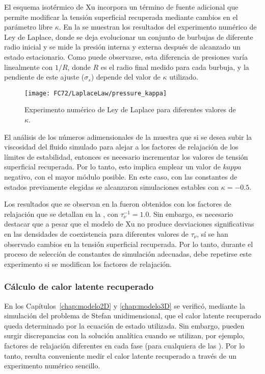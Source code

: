 El esquema isot\'ermico de Xu incorpora un t\'ermino de fuente adicional que permite modificar la tensi\'on superficial recuperada mediante cambios en el par\'ametro libre $\kappa$. En la  se muestran los resultados del experimento num\'erico de Ley de Laplace, donde se deja evolucionar un conjunto de burbujas de diferente radio inicial y se mide la presi\'on interna y externa despu\'es de alcanzado un estado estacionario. Como puede observarse, esta diferencia de presiones var\'ia linealmente con $1/R$, donde $R$ es el radio final medido para cada burbuja, y la pendiente de este ajuste ($\sigma_s$) depende del valor de $\kappa$ utilizado.

\begin{figure}[ht]
	\centering
	\texttt{[image: FC72/LaplaceLaw/pressure\_kappa]}
	\caption{Experimento num\'erico de Ley de Laplace para diferentes valores de $\kappa$.}
	\label{fig:delta_p_kappa}
\end{figure}

El an\'alisis de los n\'umeros adimensionales de la  muestra que si se desea subir la viscosidad del fluido simulado para alejar a los factores de relajaci\'on de los l\'imites de estabilidad, entonces es necesario incrementar los valores de tensi\'on superficial recuperada. Por lo tanto, esto implica emplear un valor de $kappa$ negativo, con el mayor m\'odulo posible. En este caso, con las constantes de estados previamente elegidas se alcanzaron simulaciones estables con $\kappa=-0.5$.

Los resultados que se observan en la  fueron obtenidos con los factores de relajaci\'on que se detallan en la , con $\tau_{\nu}^{-1}=1.0$. Sin embargo, es necesario destacar que a pesar que el modelo de Xu no produce desviaciones significativas en las densidades de coexistencia para diferentes valores de $\tau_{\nu}$, s\'i se han observado cambios en la tensi\'on superficial recuperada. Por lo tanto, durante el proceso de selecci\'on de constantes de simulaci\'on adecuadas, debe repetirse este experimento si se modifican los factores de relajaci\'on.


\subsubsection{C\'alculo de calor latente recuperado}

En los Cap\'itulos~\ref{chap:modelo2D} y \ref{chap:modelo3D} se verific\'o, mediante la simulaci\'on del problema de Stefan unidimensional, que el calor latente recuperado queda determinado por la ecuaci\'on de estado utilizada. Sin embargo, pueden surgir discrepancias con la soluci\'on anal\'itica cuando se utilizan, por ejemplo, factores de relajaci\'on  diferentes en cada fase (para cualquiera de las \lbe{}). Por lo tanto, resulta conveniente medir el calor latente recuperado a trav\'es de un experimento num\'erico sencillo.


